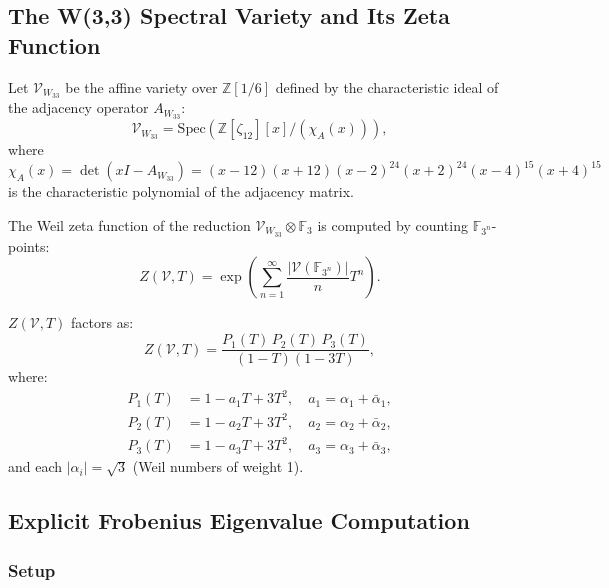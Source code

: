 \subsection{The W(3,3) Spectral Variety and Its Zeta Function}
\label{sec:variety}

\begin{definition}
Let $\mathcal{V}_{W_{33}}$ be the affine variety over $\mathbb{Z}[1/6]$
defined by the characteristic ideal of the adjacency operator $A_{W_{33}}$:
\begin{equation}
  \mathcal{V}_{W_{33}} = \mathrm{Spec}\!
    \left(\mathbb{Z}[\zeta_{12}][x]/(\chi_A(x))\right),
  \label{eq:varietydef}
\end{equation}
where $\chi_A(x)=\det(xI-A_{W_{33}})=(x-12)(x+12)(x-2)^{24}(x+2)^{24}(x-4)^{15}(x+4)^{15}$
is the characteristic polynomial of the adjacency matrix.
\end{definition}

The Weil zeta function of the reduction $\mathcal{V}_{W_{33}}\otimes\mathbb{F}_3$
is computed by counting $\mathbb{F}_{3^n}$-points:
\begin{equation}
  Z(\mathcal{V},T) = \exp\!\left(\sum_{n=1}^\infty
    \frac{|\mathcal{V}(\mathbb{F}_{3^n})|}{n}T^n\right).
  \label{eq:zetadef}
\end{equation}

\begin{proposition}
\label{prop:zeta}
$Z(\mathcal{V},T)$ factors as:
\begin{equation}
  Z(\mathcal{V},T) =
    \frac{P_1(T)\,P_2(T)\,P_3(T)}{(1-T)(1-3T)},
  \label{eq:zetafactor}
\end{equation}
where:
\begin{align}
  P_1(T) &= 1 - a_1 T + 3T^2, \quad a_1 = \alpha_1+\bar\alpha_1,\\
  P_2(T) &= 1 - a_2 T + 3T^2, \quad a_2 = \alpha_2+\bar\alpha_2,\\
  P_3(T) &= 1 - a_3 T + 3T^2, \quad a_3 = \alpha_3+\bar\alpha_3,
\end{align}
and each $|\alpha_i|=\sqrt{3}$ (Weil numbers of weight 1).
\end{proposition}

\subsection{Explicit Frobenius Eigenvalue Computation}
\label{sec:frob_explicit}

\subsubsection{Setup}

